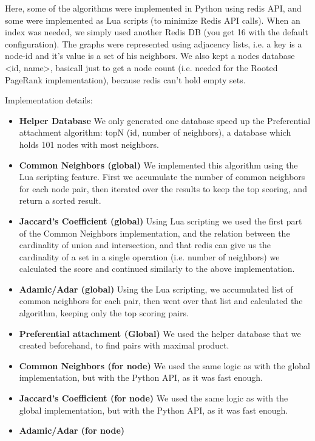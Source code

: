 Here, some of the algorithms were implemented in Python using redis API, and
some were implemented as Lua scripts (to minimize Redis API calls). When an
index was needed, we simply used another Redis DB (you get 16 with the default
configuration). 
The graphs were represented using adjacency lists, i.e. a key is a node-id and
it's value is a set of his neighbors. We also kept a nodes database <id, name>, 
basicall just to get a node count (i.e. needed for the Rooted PageRank implementation),
because redis can't hold empty sets.
\linebreak

Implementation details:
\begin{itemize}
	\item {\bf Helper Database} 
        We only generated one database speed up the Preferential attachment algorithm:
	    topN (id, number of neighbors), a database which holds 101 nodes with most neighbors.
	\item {\bf Common Neighbors (global)} 
        We implemented this algorithm using the Lua scripting feature. First we accumulate 
        the number of common neighbors for each node pair, then iterated over the results 
        to keep the top scoring, and return a sorted result.
	\item {\bf Jaccard's Coefficient (global)}
        Using Lua scripting we used the first part of the Common Neighbors implementation,
        and the relation between the cardinality of union and intersection, and that redis
        can give us the cardinality of a set in a single operation (i.e. number of neighbors)
        we calculated the score and continued similarly to the above implementation.
	\item {\bf Adamic/Adar (global)} 
        Using the Lua scripting, we accumulated list of common neighbors for each pair,
        then went over that list and calculated the algorithm, keeping only the top scoring pairs.
	\item {\bf Preferential attachment (Global)}
        We used the helper database that we created beforehand, to find pairs 
		with maximal product.
	\item {\bf Common Neighbors (for node)}
        We used the same logic as with the global implementation, but with the 
		Python API, as it was fast enough.
	\item {\bf Jaccard's Coefficient (for node)}
        We used the same logic as with the global implementation, but with the 
		Python API, as it was fast enough.
	\item {\bf Adamic/Adar (for node)}

\end{itemize}
